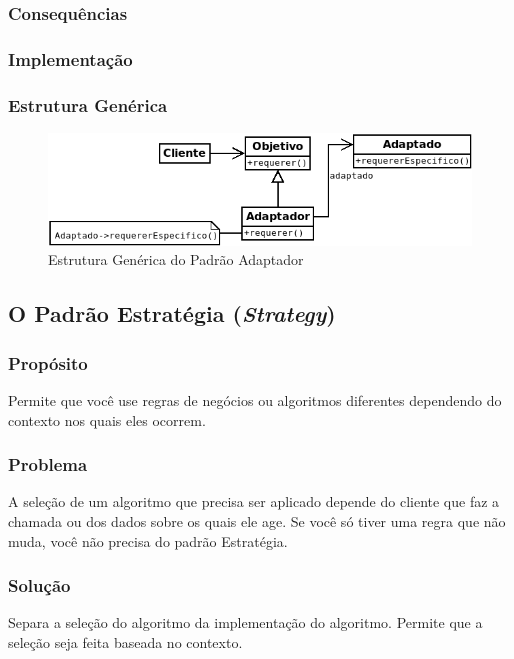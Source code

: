 \subsubsection{Consequências}
\subsubsection{Implementação}
\subsubsection{Estrutura Genérica}

\begin{figure}[h]
\begin{center}
\includegraphics[scale=0.6]{adaptador.png}
\caption{Estrutura Genérica do Padrão Adaptador}\label{fig:adaptador}
\end{center}
\end{figure}

\subsection{O Padrão Estratégia (\textit{Strategy})}
\subsubsection{Propósito}
Permite que você use regras de negócios ou algoritmos diferentes dependendo do contexto nos quais eles ocorrem.

\subsubsection{Problema}
A seleção de um algoritmo que precisa ser aplicado depende do cliente que faz a chamada ou dos dados sobre os quais ele age. Se você só tiver uma regra que não muda, você não precisa do padrão Estratégia.

\subsubsection{Solução}
Separa a seleção do algoritmo da implementação do algoritmo. Permite que a seleção seja feita baseada no contexto.

